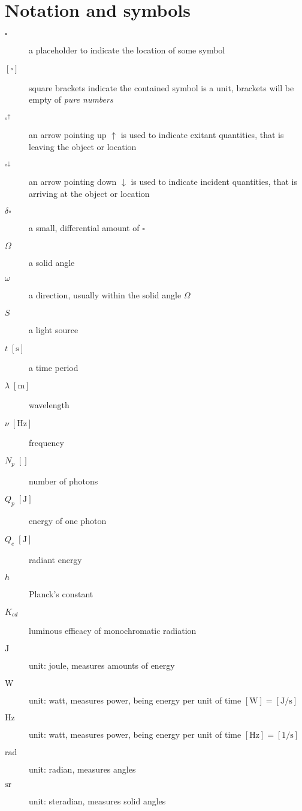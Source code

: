 
\chapter{Notation and symbols}\label{ch:notation}

\begin{description}
\item[ {$\square$} ] a placeholder to indicate the location of some symbol
\item[ {$[\square]$} ] square brackets indicate the contained symbol is a unit,
	brackets will be empty of \emph{pure numbers}
\item[ {$\square^\uparrow$} ] an arrow pointing up $\uparrow$ is used to indicate 
	exitant quantities, that is leaving the object or location
\item[ {$\square^\downarrow$} ] an arrow pointing down $\downarrow$ is used to indicate 
	incident quantities, that is arriving at the object or location

\item[ {$\delta\square$} ] a small, differential amount of $\square$

\item[{$\Omega$}] a solid angle
\item[{$\omega$}] a direction, usually within the solid angle $\Omega$
\item[$S$] a light source
\item[ {$t\;[\unit\second]$} ] a time period

\item[ {$\lambda\;[\unit\meter]$} ] wavelength
\item[ {$\nu\;[\unit\hertz]$} ] frequency

\item[ {$N_p\;[]$} ] number of photons
\item[ {$Q_p\;[\unit\joule]$} ] energy of one photon
\item[ {$Q_e\;[\unit\joule]$} ] radiant energy

\item[ {$h$} ] Planck's constant
\item[ {$K_{cd}$} ] luminous efficacy of monochromatic radiation

\item[ {$\unit\joule$} ] unit: joule, measures amounts of energy
\item[ {$\unit\watt$} ] unit: watt, measures power, being energy per 
	unit of time $[\unit\watt] = [\unit{\joule\per\second}]$
\item[ {$\unit\hertz$} ] unit: watt, measures power, being energy per 
	unit of time $[\unit\hertz] = [\unit{1\per\second}]$
\item[ {$\unit\radian$} ] 	unit: radian, measures angles
\item[ {$\unit\steradian$} ] unit: steradian, measures solid angles
                   
\end{description}

